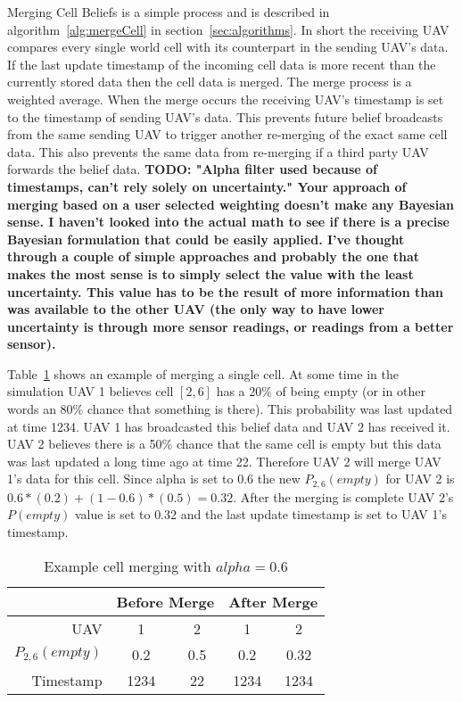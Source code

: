 \begin{multicols*}{2}


Merging Cell Beliefs is a simple process and is described in algorithm~\ref{alg:mergeCell} in section~\ref{sec:algorithms}.   In short the receiving UAV compares every single world cell with its counterpart in the sending UAV's data.  If the last update timestamp of the incoming cell data is more recent than the currently stored data then the cell data is merged.  The merge process is a weighted average.  When the merge occurs the receiving UAV's timestamp is set to the timestamp of sending UAV's data.  This prevents future belief broadcasts from the same sending UAV to trigger another re-merging of the exact same cell data.  This also prevents the same data from re-merging if a third party UAV forwards the belief data. \textbf{TODO: "Alpha filter used because of timestamps, can't rely solely on uncertainty." Your approach of merging based on a user selected weighting doesn’t make any Bayesian sense. I haven’t looked into the actual math to see if there is a precise Bayesian formulation that could be easily applied. I’ve thought through a couple of simple approaches and probably the one that makes the most sense is to simply select the value with the least uncertainty. This value has to be the result of more information than was available to the other UAV (the only way to have lower uncertainty is through more sensor readings, or readings from a better sensor). }

Table~\ref{tab:exampleCellMerge} shows an example of merging a single cell.  At some time in the simulation UAV 1 believes cell $[2, 6]$ has a 20\% of being empty (or in other words an 80\% chance that something is there). This probability was last updated at time 1234.  UAV 1 has broadcasted this belief data and UAV 2 has received it.  UAV 2 believes there is a 50\% chance that the same cell is empty but this data was last updated a long time ago at time 22.  Therefore UAV 2 will merge UAV 1's data for this cell.  Since alpha is set to 0.6 the new $P_{2,6}(empty)$ for UAV 2 is $0.6*(0.2) + (1-0.6)*(0.5)=0.32$.  After the merging is complete UAV 2's $P(empty)$ value is set to $0.32$ and the last update timestamp is set to UAV 1's timestamp.

\begin{table}[H]
	\caption{Example cell merging with $alpha=0.6$}
	\centering
	\label{tab:exampleCellMerge}
	\begin{tabular}{|r|c|c||c|c|}
		\hline
		                & \multicolumn{2}{c||}{Before Merge} & \multicolumn{2}{c|}{After Merge} \\
		\hline
		UAV             & 1   & 2                            & 1   & 2 \\
		\hline
		$P_{2,6}(empty)$& 0.2 & 0.5                          & 0.2 & 0.32 \\
		\hline
		Timestamp       & 1234& 22                           & 1234& 1234 \\
		\hline
	\end{tabular}
\end{table}


\end{multicols*}
